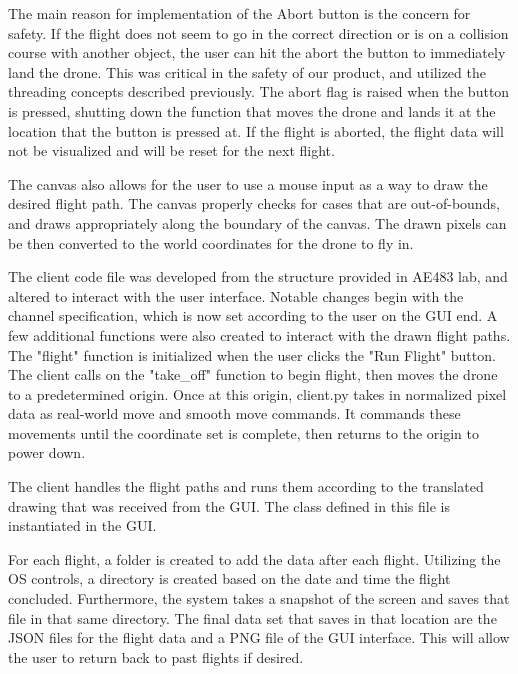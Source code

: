 \documentclass[conf]{new-aiaa}
\begin{document}
            The main reason for implementation of the Abort button is the concern for safety. If the flight does not seem to go in the correct direction or is on a collision course with another object, the user can hit the abort the button to immediately land the drone. This was critical in the safety of our product, and utilized the threading concepts described previously. The abort flag is raised when the button is pressed, shutting down the function that moves the drone and lands it at the location that the button is pressed at. If the flight is aborted, the flight data will not be visualized and will be reset for the next flight.
            
            The canvas also allows for the user to use a mouse input as a way to draw the desired flight path. The canvas properly checks for cases that are out-of-bounds, and draws appropriately along the boundary of the canvas. The drawn pixels can be then converted to the world coordinates for the drone to fly in. 
            
            The client code file was developed from the structure provided in AE483 lab, and altered to interact with the user interface. Notable changes begin with the channel specification, which is now set according to the user on the GUI end. A few additional functions were also created to interact with the drawn flight paths. The "flight" function is initialized when the user clicks the "Run Flight" button. The client calls on the "take\_off" function to begin flight, then moves the drone to a predetermined origin. Once at this origin, client.py takes in normalized pixel data as real-world move and smooth move commands. It commands these movements until the coordinate set is complete, then returns to the origin to power down.
             
            The client handles the flight paths and runs them according to the translated drawing that was received from the GUI. The class defined in this file is instantiated in the GUI.
            
            For each flight, a folder is created to add the data after each flight. Utilizing the OS controls, a directory is created based on the date and time the flight concluded. Furthermore, the system takes a snapshot of the screen and saves that file in that same directory. The final data set that saves in that location are the JSON files for the flight data and a PNG file of the GUI interface. This will allow the user to return back to past flights if desired. 
            
\end{document}
